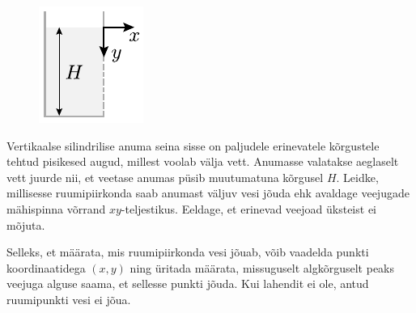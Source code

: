 
\begin{figure}%
\vspace{-15pt}
\includegraphics[width=\linewidth]{2015-lahg-07-veejoadJoon}%
\end{figure}
Vertikaalse silindrilise anuma seina sisse on paljudele erinevatele kõrgustele tehtud pisikesed augud, millest voolab välja vett. Anumasse valatakse aeglaselt vett juurde nii, et veetase anumas püsib muutumatuna kõrgusel $H$. Leidke, millisesse ruumipiirkonda saab anumast väljuv vesi jõuda ehk avaldage veejugade mähispinna võrrand $xy$-teljestikus. Eeldage, et erinevad veejoad üksteist ei mõjuta.

\hint
Selleks, et määrata, mis ruumipiirkonda vesi jõuab, võib vaadelda punkti koordinaatidega $(x, y)$ ning üritada määrata, missuguselt algkõrguselt peaks veejuga alguse saama, et sellesse punkti jõuda. Kui lahendit ei ole, antud ruumipunkti vesi ei jõua.

